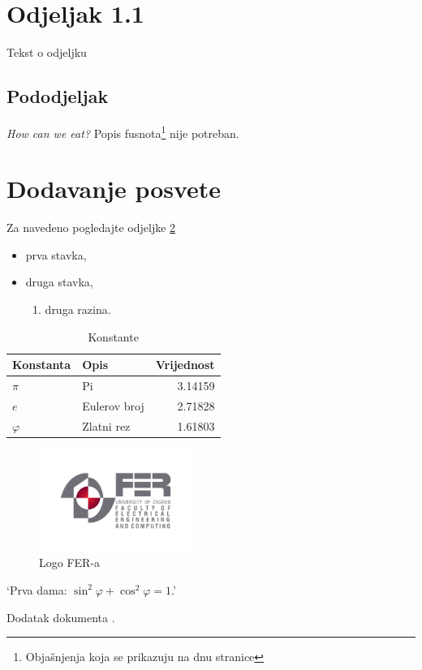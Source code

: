 \documentclass[times, utf8, diplomski]{fer}
\begin{document}
{\section{Odjeljak 1.1}
Tekst o odjeljku
\subsection{Pododjeljak}
\emph{How can we eat?}
Popis fusnota\footnote{Objašnjenja koja se prikazuju
na dnu stranice} nije potreban.
\section{Dodavanje posvete}
\label{sec:posveta}
Za navedeno pogledajte odjeljke \ref{sec:posveta}
\begin{itemize}
	\item prva stavka,
	\item druga stavka,
	\begin{enumerate}
		\item druga razina.
	\end{enumerate}
\end{itemize}

\begin{table}[htb]
\caption{Konstante}
\label{tbl:konstante}
\centering
\begin{tabular}{llr} \toprule
Konstanta & Opis & Vrijednost\\ \midrule
$\pi$ & Pi & 3.14159 \\
$e$ & Eulerov broj & 2.71828 \\
$\varphi$ & Zlatni rez & 1.61803 \\ \bottomrule
\end{tabular}
\end{table}

\begin{figure}[htb]
\centering
\includegraphics[width=5cm]{img/fer_logo.jpg}
\caption{Logo FER-a}
\label{fig:fer-logo}
\end{figure}

‘Prva dama: $\sin^2 \varphi + \cos^2 \varphi = 1$.’ \citep{ungar2002uvod} \cite{oetiket2007lshort}

Dodatak dokumenta .

}
\end{document}
